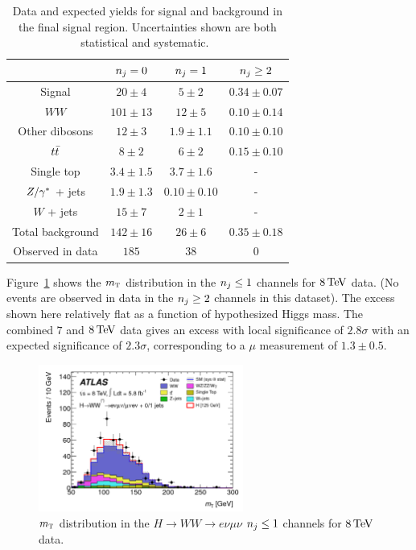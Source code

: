 \begin{table}[h!]
\centering
\captionsetup{justification=centering}

\hspace{-10pt}
\begin{tabular}{|c|c|c|c|}
\hline
& $n_j = 0$ & $n_j = 1$ & $n_j \geq 2$\\ \hline
Signal & $20 \pm 4$ & $5 \pm 2$ & $0.34 \pm 0.07$ \\ \hline
$WW$ & $101 \pm 13$ & $12 \pm 5$ & $0.10 \pm 0.14$ \\ 
Other dibosons & $12 \pm 3$ & $1.9 \pm 1.1$ & $0.10 \pm 0.10$ \\ 
$t\bar{t}$ & $8 \pm 2$ & $6 \pm 2$ & $0.15 \pm 0.10$ \\ 
Single top & $3.4 \pm 1.5$ & $3.7 \pm 1.6$ & - \\ 
$Z/\gamma^{\ast}$ + jets & $1.9 \pm 1.3$ & $0.10 \pm 0.10$ & - \\ 
$W$ + jets & $15 \pm 7$ & $2 \pm 1$ & - \\ \hline
Total background & $142 \pm 16$ & $26 \pm 6$ & $0.35 \pm 0.18$ \\ \hline
Observed in data & $185$ & $38$ & $0$ \\ \hline
\end{tabular}

\caption{
Data and expected yields for signal and background in the final \HWWfull signal region. Uncertainties shown are both statistical and systematic.~\cite{Discovery}
}
\label{tab:disc_ww_results}
\end{table}

Figure~\ref{fig:disc_mt} shows the $m_{\textrm{\footnotesize\sc t}}$ distribution in the $n_j \leq 1$ channels for $8 \TeV$ data. (No events are observed in data in the $n_j \geq 2$ channels in this dataset). The excess shown here relatively flat as a function of hypothesized Higgs mass. The combined $7$ and $8\TeV$ data gives an excess with local significance of $2.8\sigma$ with an expected significance of $2.3\sigma$, corresponding to a $\mu$ measurement of $1.3\pm 0.5$. 

\begin{figure}[h!]
  \centering
  \captionsetup{justification=centering}
  \includegraphics[width=0.6\textwidth]{figures/discovery_mt}
  \caption{$m_{\textrm{\footnotesize\sc t}}$ distribution in the $H\to WW \to e\nu\mu\nu$ $n_j \leq 1$ channels for $8 \TeV$ data\cite{Discovery}.}
  \label{fig:disc_mt}
\end{figure}


